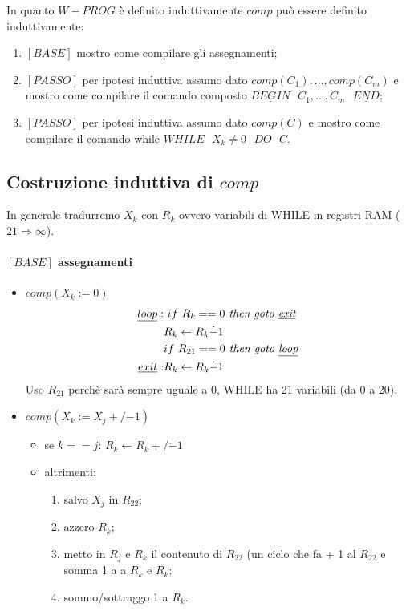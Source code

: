 \documentclass{article}
\begin{document}
In quanto $W-PROG$ è definito induttivamente $comp$ può essere definito induttivamente:
\begin{enumerate}
	\item $[BASE]$ mostro come compilare gli assegnamenti;
	\item $[PASSO]$ per ipotesi induttiva assumo dato $comp(C_1), \dots, comp(C_m)$ e mostro come compilare il comando composto $\underline{BEGIN} \textit{ } C_1, \dots, C_m \textit{ } \underline{END}$;
	\item $[PASSO]$ per ipotesi induttiva assumo dato $comp(C)$ e mostro come compilare il comando while $\underline{WHILE}\textit{ } X_k \neq 0\textit{ } \underline{DO}\textit{ } C$.
\end{enumerate}

\subsection{Costruzione induttiva di $comp$}
In generale tradurremo $X_k$ con $R_k$ ovvero variabili di WHILE in registri RAM ($21 \Rightarrow \infty$).
\paragraph{$[BASE]$ assegnamenti}
\begin{itemize}
	\item $comp(X_k := 0)$
	\begin{displaymath}
		\begin{split}
			 \underline{loop}: &\text{ } if \text{ } R_k == 0 \textit{ then goto \underline{exit}} \\
			 & R_k \leftarrow R_k \dot{-} 1 \\
			 & if \text{ } R_{21} == 0 \textit{ then goto \underline{loop}} \\
			 \underline{exit}: & R_k \leftarrow R_k \dot{-} 1 
		\end{split}
	\end{displaymath}
	Uso $R_{21}$ perchè sarà sempre uguale a 0, WHILE ha 21 variabili (da 0 a 20).
	\item $comp(X_k := X_j +/\dot{-} 1)$
	\begin{itemize}
		\item se $k==j$: $R_k \leftarrow R_k +/\dot{-} 1$
		\item altrimenti: \begin{enumerate}
			\item salvo $X_j$ in $R_{22}$;
			\item azzero $R_k$;
			\item metto in $R_j$ e $R_k$ il contenuto di $R_22$ (un ciclo che fa + 1 al $R_{22}$ e somma 1 a a $R_k$ e $R_k$;
			\item sommo/sottraggo 1 a $R_k$.
		\end{enumerate}
	\end{itemize}
\end{itemize}
\end{document}
